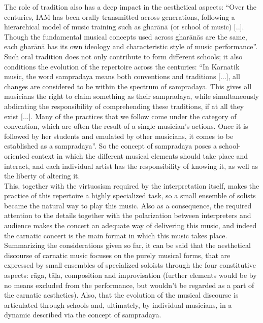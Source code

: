 The role of tradition also has a deep impact in the aesthetical aspects: ``Over the centuries, IAM has been orally transmitted across generations, following a hierarchical model of music training such as ghar\=an\=a (or school of music) [..]. Though the fundamental musical concepts used across ghar\=an\=as are the same, each ghar\=an\=a has its own ideology and characteristic style of music performance''\cite[p.16]{gulati}.\\

Such oral tradition does not only contribute to form different schools; it also conditions the evolution of the repertoire across the centuries: ``In Karnatik music, the word sampradaya means both conventions and traditions [...], all changes are considered to be within the spectrum of sampradaya. This gives all musicians the right to claim something as their sampradaya, while simultaneously abdicating the responsibility of comprehending these traditions, if at all they exist [...]. Many of the practices that we follow come under the category of convention, which are often the result of a single musician's actions. Once it is followed by her students and emulated by other musicians, it comes to be established as a sampradaya''\cite[p.13]{krishna}. So the concept of sampradaya poses a school-oriented context in which the different musical elements should take place and interact, and each individual artist has the responsibility of knowing it, as well as the liberty of altering it.\\

This, together with the virtuosism required by the interpretation itself, makes the practice of this repertoire a highly specialized task, so a small ensemble of solists became the natural way to play this music. Also as a consequence, the required attention to the details together with the polarization between interpreters and audience makes the concert an adequate way of delivering this music, and indeed the carnatic concert is the main format in which this music takes place.\\


Summarizing the considerations given so far, it can be said that the aesthetical discourse of carnatic music focuses on the purely musical forms, that are expressed by small ensembles of specialized soloists through the four constitutive aspects: r\=aga, t\=a\d{l}a, composition and improvisation (further elements would be by no means excluded from the performance, but wouldn't be  regarded as a part of the carnatic aesthetics). Also, that the evolution of the musical discourse is articulated through schools and, ultimately, by individual musicians, in a dynamic described via the concept of sampradaya.


